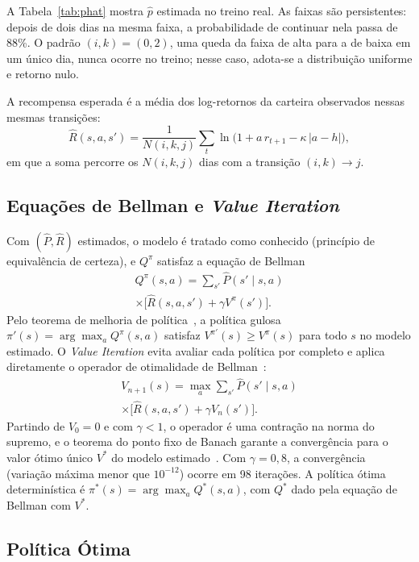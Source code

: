 \documentclass[conference]{IEEEtran}
\begin{document}
A Tabela~\ref{tab:phat} mostra $\hat{p}$ estimada no treino real. As faixas são persistentes: depois de dois dias na mesma faixa, a probabilidade de continuar nela passa de 88\%. O padrão $(i,k) = (0,2)$, uma queda da faixa de alta para a de baixa em um único dia, nunca ocorre no treino; nesse caso, adota-se a distribuição uniforme e retorno nulo.

A recompensa esperada é a média dos log-retornos da carteira observados nessas mesmas transições:
\begin{equation}
  \hat{R}(s,a,s') = \frac{1}{N(i,k,j)} \sum_{t} \ln\!\big(1 + a\, r_{t+1} - \kappa\, |a - h|\big),
\end{equation}
em que a soma percorre os $N(i,k,j)$ dias com a transição $(i,k) \to j$.

\subsection{Equações de Bellman e \textit{Value Iteration}}
\label{sec:vi}

Com $(\hat{P}, \hat{R})$ estimados, o modelo é tratado como conhecido (princípio de equivalência de certeza), e $Q^\pi$ satisfaz a equação de Bellman
\begin{multline}
  Q^\pi(s,a) = \sum_{s'} \hat{P}(s' \mid s,a) \\
  \times \big[\hat{R}(s,a,s') + \gamma V^\pi(s')\big].
\end{multline}
Pelo teorema de melhoria de política~\cite{sutton2018}, a política gulosa $\pi'(s) = \arg\max_{a} Q^\pi(s,a)$ satisfaz $V^{\pi'}(s) \ge V^\pi(s)$ para todo $s$ no modelo estimado. O \textit{Value Iteration} evita avaliar cada política por completo e aplica diretamente o operador de otimalidade de Bellman~\cite{bellman1957,sutton2018}:
\begin{multline}
  V_{n+1}(s) = \max_{a} \sum_{s'} \hat{P}(s' \mid s,a) \\
  \times \big[\hat{R}(s,a,s') + \gamma V_n(s')\big].
\end{multline}
Partindo de $V_0 = 0$ e com $\gamma < 1$, o operador é uma contração na norma do supremo, e o teorema do ponto fixo de Banach garante a convergência para o valor ótimo único $V^*$ do modelo estimado~\cite{puterman1994}. Com $\gamma = 0{,}8$, a convergência (variação máxima menor que $10^{-12}$) ocorre em 98 iterações. A política ótima determinística é $\pi^*(s) = \arg\max_{a} Q^*(s,a)$, com $Q^*$ dado pela equação de Bellman com $V^*$.

\subsection{Política Ótima}
\end{document}
